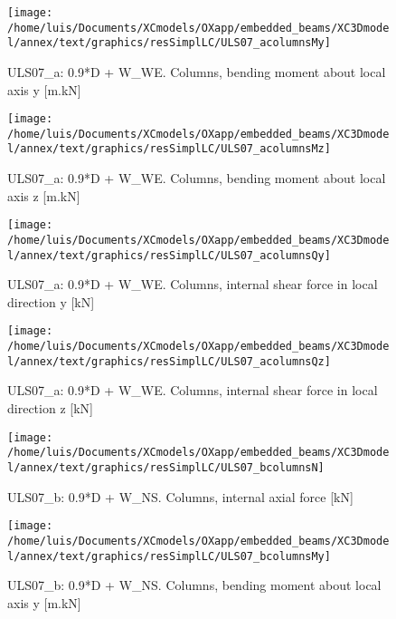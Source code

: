 \begin{figure}
\begin{center}
\texttt{[image: /home/luis/Documents/XCmodels/OXapp/embedded\_beams/XC3Dmodel/annex/text/graphics/resSimplLC/ULS07\_acolumnsMy]}
\caption{ULS07_a: 0.9*D + W_WE. Columns, bending moment about local axis y [m.kN]}
\end{center}
\end{figure}
\begin{figure}
\begin{center}
\texttt{[image: /home/luis/Documents/XCmodels/OXapp/embedded\_beams/XC3Dmodel/annex/text/graphics/resSimplLC/ULS07\_acolumnsMz]}
\caption{ULS07_a: 0.9*D + W_WE. Columns, bending moment about local axis z [m.kN]}
\end{center}
\end{figure}
\begin{figure}
\begin{center}
\texttt{[image: /home/luis/Documents/XCmodels/OXapp/embedded\_beams/XC3Dmodel/annex/text/graphics/resSimplLC/ULS07\_acolumnsQy]}
\caption{ULS07_a: 0.9*D + W_WE. Columns, internal shear force in local direction y [kN]}
\end{center}
\end{figure}
\begin{figure}
\begin{center}
\texttt{[image: /home/luis/Documents/XCmodels/OXapp/embedded\_beams/XC3Dmodel/annex/text/graphics/resSimplLC/ULS07\_acolumnsQz]}
\caption{ULS07_a: 0.9*D + W_WE. Columns, internal shear force in local direction z [kN]}
\end{center}
\end{figure}
\clearpage
\begin{figure}
\begin{center}
\texttt{[image: /home/luis/Documents/XCmodels/OXapp/embedded\_beams/XC3Dmodel/annex/text/graphics/resSimplLC/ULS07\_bcolumnsN]}
\caption{ULS07_b: 0.9*D + W_NS. Columns, internal axial force [kN]}
\end{center}
\end{figure}
\begin{figure}
\begin{center}
\texttt{[image: /home/luis/Documents/XCmodels/OXapp/embedded\_beams/XC3Dmodel/annex/text/graphics/resSimplLC/ULS07\_bcolumnsMy]}
\caption{ULS07_b: 0.9*D + W_NS. Columns, bending moment about local axis y [m.kN]}
\end{center}
\end{figure}
